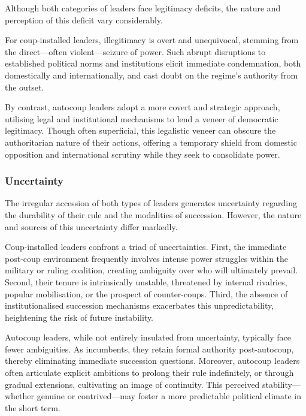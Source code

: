 \documentclass[
  12pt,
]{report}
\begin{document}
Although both categories of leaders face legitimacy deficits, the nature
and perception of this deficit vary considerably.

For coup-installed leaders, illegitimacy is overt and unequivocal,
stemming from the direct---often violent---seizure of power. Such abrupt
disruptions to established political norms and institutions elicit
immediate condemnation, both domestically and internationally, and cast
doubt on the regime's authority from the outset.

By contrast, autocoup leaders adopt a more covert and strategic
approach, utilising legal and institutional mechanisms to lend a veneer
of democratic legitimacy. Though often superficial, this legalistic
veneer can obscure the authoritarian nature of their actions, offering a
temporary shield from domestic opposition and international scrutiny
while they seek to consolidate power.

\subsubsection*{Uncertainty}\label{uncertainty}

The irregular accession of both types of leaders generates uncertainty
regarding the durability of their rule and the modalities of succession.
However, the nature and sources of this uncertainty differ markedly.

Coup-installed leaders confront a triad of uncertainties. First, the
immediate post-coup environment frequently involves intense power
struggles within the military or ruling coalition, creating ambiguity
over who will ultimately prevail. Second, their tenure is intrinsically
unstable, threatened by internal rivalries, popular mobilisation, or the
prospect of counter-coups. Third, the absence of institutionalised
succession mechanisms exacerbates this unpredictability, heightening the
risk of future instability.

Autocoup leaders, while not entirely insulated from uncertainty,
typically face fewer ambiguities. As incumbents, they retain formal
authority post-autocoup, thereby eliminating immediate succession
questions. Moreover, autocoup leaders often articulate explicit
ambitions to prolong their rule indefinitely, or through gradual
extensions, cultivating an image of continuity. This perceived
stability---whether genuine or contrived---may foster a more predictable
political climate in the short term.
\end{document}
